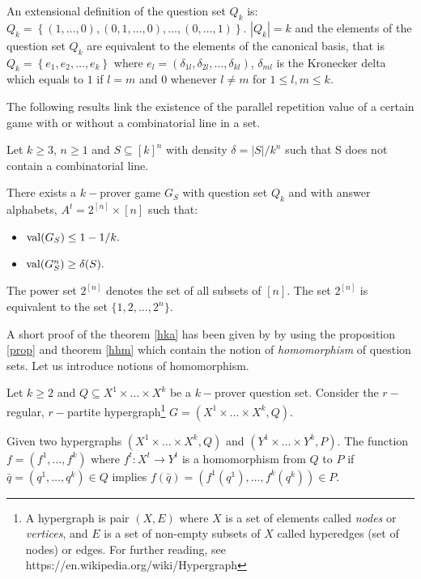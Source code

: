  An extensional definition of the question set $Q_k$ is: $Q_k=\left\lbrace (1,\ldots,0), (0,1,\ldots,0), \ldots, (0,\ldots,1) \right\rbrace.$ $|Q_k|=k$ and the elements of the question set $Q_k$ are equivalent to the elements of the canonical basis, that is $Q_k= \left\lbrace e_1, e_2, \ldots, e_k\right\rbrace$ where $e_l=(\delta_{1l}, \delta_{2l}, \ldots, \delta_{kl} )$, $\delta_{ml}$ is the Kronecker delta which equals to $1$ if $l=m$ and $0$ whenever $l \neq m$ for $1 \leq l, m \leq  k.$ 
 
The following results link the existence of the parallel repetition value of a certain game with or without a  combinatorial line in a set.
 
 \begin{thm} Let $k\geq 3$, $n\geq 1$ and $S\subseteq [k]^n$ with density $\delta=|S|/k^n$ such that S does not contain a combinatorial line.	
 
There exists a $k-$prover game $G_S$ with question set $Q_k$ and with answer alphabets,
$A^t = 2^{[n]} \times [n]$ such that:
\begin{itemize}
\item $\mathrm{val} (G_S) \leq 1-1/k.$ 	\item $\mathrm{val} (G_S^n) \geq \delta(S).$
\end{itemize} \label{hka}
 	\end{thm}
 
The power set  $2^{[n]}$ denotes the set of all subsets of $[n]$. The set $2^{[n]}$ is equivalent to the set $\{1,2,\ldots, 2^n\}.$

A short proof of the theorem \eqref{hka} has been given by \cite{hkazla2016forbidden} by using the proposition \eqref{prop} and theorem \eqref{hhm} which contain  the notion of \textit{homomorphism} of question sets. Let us introduce notions of homomorphism.

Let $k\geq 2$ and $Q \subseteq X^1 \times \ldots \times X^k$ be a $k-$prover question set. Consider the $r-$regular, $r-$partite hypergraph\footnote{A hypergraph is pair $(X,E)$ where $X$ is a set of elements called \textit{nodes} or \textit{vertices}, and $E$ is a set of non-empty subsets of $X$ called hyperedges (set of nodes) or edges. For further reading, see https://en.wikipedia.org/wiki/Hypergraph} $G=(X^1 \times \ldots \times X^k, Q).$

 Given two hypergraphs $(X^1 \times \ldots \times X^k, Q)$ and $(Y^1 \times \ldots \times Y^k, P)$. The function $f=(f^1, \ldots, f^k)$ where $f^t: X^t \longrightarrow Y^t$ is a homomorphism from $Q$ to $P$ if $\bar{q}=(q^1, \ldots,q^k) \in Q$ implies $f(\bar{q})=(f^1(q^1), \ldots,f^k(q^k)) \in P.$

